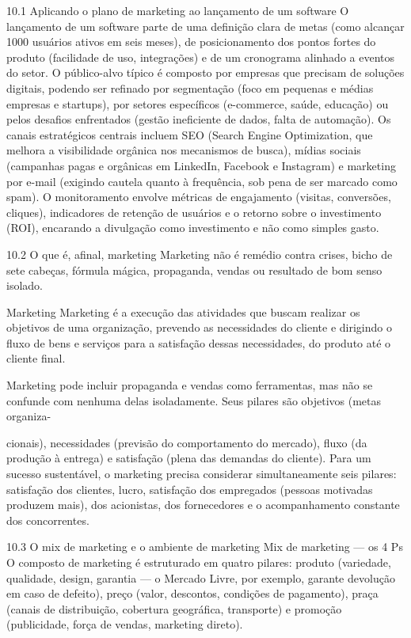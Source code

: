 10.1 Aplicando o plano de marketing ao lançamento de um software O lançamento de um software parte de uma definição clara de metas (como alcançar 1000 usuários ativos em seis meses), de posicionamento dos pontos fortes do produto (facilidade de uso, integrações) e de um cronograma alinhado a eventos do setor. O público-alvo típico é composto por empresas que precisam de soluções digitais, podendo ser refinado por segmentação (foco em pequenas e médias empresas e startups), por setores específicos (e-commerce, saúde, educação) ou pelos desafios enfrentados (gestão ineficiente de dados, falta de automação). Os canais estratégicos centrais incluem SEO (Search Engine Optimization, que melhora a visibilidade orgânica nos mecanismos de busca), mídias sociais (campanhas pagas e orgânicas em LinkedIn, Facebook e Instagram) e marketing por e-mail (exigindo cautela quanto à frequência, sob pena de ser marcado como spam). O monitoramento envolve métricas de engajamento (visitas, conversões, cliques), indicadores de retenção de usuários e o retorno sobre o investimento (ROI), encarando a divulgação como investimento e não como simples gasto.

10.2 O que é, afinal, marketing Marketing não é remédio contra crises, bicho de sete cabeças, fórmula mágica, propaganda, vendas ou resultado de bom senso isolado.

Marketing Marketing é a execução das atividades que buscam realizar os objetivos de uma organização, prevendo as necessidades do cliente e dirigindo o fluxo de bens e serviços para a satisfação dessas necessidades, do produto até o cliente final.

Marketing pode incluir propaganda e vendas como ferramentas, mas não se confunde com nenhuma delas isoladamente. Seus pilares são objetivos (metas organiza-

cionais), necessidades (previsão do comportamento do mercado), fluxo (da produção à entrega) e satisfação (plena das demandas do cliente). Para um sucesso sustentável, o marketing precisa considerar simultaneamente seis pilares: satisfação dos clientes, lucro, satisfação dos empregados (pessoas motivadas produzem mais), dos acionistas, dos fornecedores e o acompanhamento constante dos concorrentes.

10.3 O mix de marketing e o ambiente de marketing Mix de marketing — os 4 Ps O composto de marketing é estruturado em quatro pilares: produto (variedade, qualidade, design, garantia — o Mercado Livre, por exemplo, garante devolução em caso de defeito), preço (valor, descontos, condições de pagamento), praça (canais de distribuição, cobertura geográfica, transporte) e promoção (publicidade, força de vendas, marketing direto).

